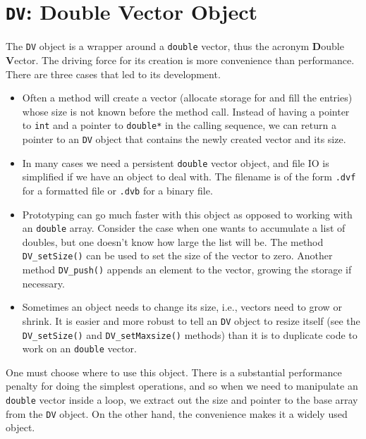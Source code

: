 \chapter{{\tt DV}: Double Vector Object}
\par
The {\tt DV} object is a wrapper around a {\tt double} vector,
thus the acronym {\bf D}ouble {\bf V}ector.
The driving force for its creation is more convenience than 
performance.
There are three cases that led to its development.
\begin{itemize}
\item 
Often a method will create a vector (allocate storage for and fill
the entries) whose size is not known before the method call.
Instead of having a pointer to {\tt int} and a pointer to {\tt double*}
in the calling sequence, we can return a pointer to an {\tt DV}
object that contains the newly created vector and its size.
\item
In many cases we need a persistent {\tt double} vector object,
and file IO is simplified if we have an object to deal with.
The filename is of the form {\tt *.dvf} for a formatted file
or {\tt *.dvb} for a binary file.
\item
Prototyping can go much faster with this object as opposed to
working with an {\tt double} array.
Consider the case when one wants to accumulate a list of doubles,
but one doesn't know how large the list will be.
The method {\tt DV\_setSize()} can be used to set 
the size of the vector to zero.
Another method {\tt DV\_push()} appends an element to the vector,
growing the storage if necessary.
\item
Sometimes an object needs to change its size, i.e., vectors need to
grow or shrink.
It is easier and more robust to tell an {\tt DV} object to resize
itself (see the {\tt DV\_setSize()} and {\tt DV\_setMaxsize()}
methods) than it is to duplicate code to work on an {\tt double}
vector.
\end{itemize}
One must choose where to use this object.
There is a substantial performance penalty for doing the simplest
operations, and so when we need to manipulate an {\tt double} vector
inside a loop, we extract out the size and pointer to the base
array from the {\tt DV} object.
On the other hand, the convenience makes it a widely used object.
\par
